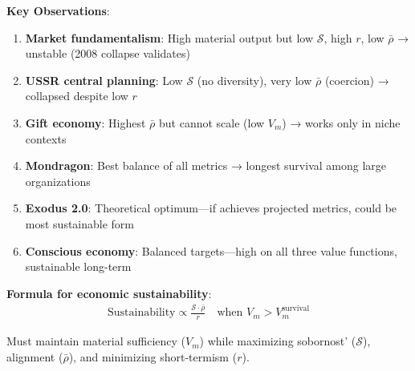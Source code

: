 \documentclass[11pt,a4paper]{article}
\theoremstyle{definition}
\theoremstyle{remark}
\begin{document}
\begin{enumerate}
\textbf{Key Observations}:
\begin{enumerate}
    \item \textbf{Market fundamentalism}: High material output but low \(\mathcal{S}\), high \(r\), low \(\bar{\rho}\) → unstable (2008 collapse validates)
    \item \textbf{USSR central planning}: Low \(\mathcal{S}\) (no diversity), very low \(\bar{\rho}\) (coercion) → collapsed despite low \(r\)
    \item \textbf{Gift economy}: Highest \(\bar{\rho}\) but cannot scale (low \(V_m\)) → works only in niche contexts
    \item \textbf{Mondragon}: Best balance of all metrics → longest survival among large organizations
    \item \textbf{Exodus 2.0}: Theoretical optimum—if achieves projected metrics, could be most sustainable form
    \item \textbf{Conscious economy}: Balanced targets—high on all three value functions, sustainable long-term
\end{enumerate}

\textbf{Formula for economic sustainability}:
\begin{align}
\text{Sustainability} \propto \frac{\mathcal{S} \cdot \bar{\rho}}{r} \quad \text{when } V_m > V_m^{\text{survival}}
\end{align}

Must maintain material sufficiency (\(V_m\)) while maximizing sobornost' (\(\mathcal{S}\)), alignment (\(\bar{\rho}\)), and minimizing short-termism (\(r\)).

\vspace{2em}

\begin{figure}[H]
\centering
{}
\end{figure}
\end{enumerate}
\end{document}

